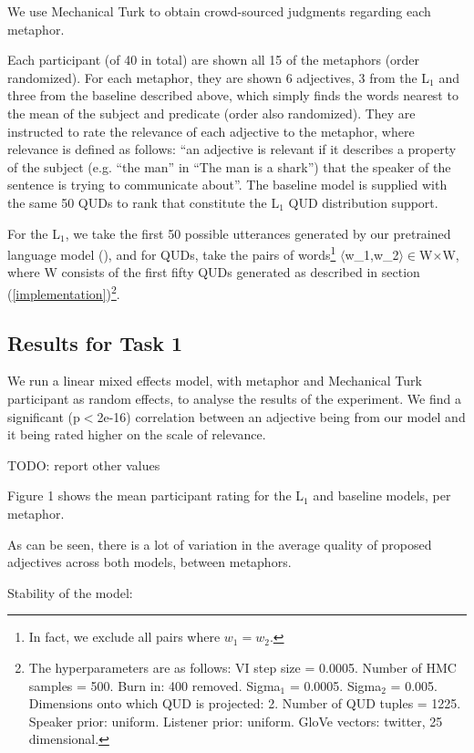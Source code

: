 \documentclass[10pt,letterpaper,twocolumn]{article}
\begin{document}
We use Mechanical Turk to obtain crowd-sourced judgments regarding each metaphor. 

	Each participant (of 40 in total) are shown all 15 of the metaphors (order randomized). For each metaphor, they are shown 6 adjectives, 3 from the L$_1$ and three from the baseline described above, which simply finds the words nearest to the mean of the subject and predicate (order also randomized). They are instructed to rate the relevance of each adjective to the metaphor, where relevance is defined as follows: ``an adjective is relevant if it describes a property of the subject (e.g. ``the man'' in ``The man is a shark'') that the speaker of the sentence is trying to communicate about''. The baseline model is supplied with the same 50 QUDs to rank that constitute the L$_1$ QUD distribution support.

	For the L$_1$, we take the first 50 possible utterances generated by our pretrained language model (\cite{jozefowicz2016exploring}), and for QUDs, take the pairs of words\footnote{In fact, we exclude all pairs where $w_1=w_2$.} $\langle$w_1,w_2$\rangle\in$W$\times$W, where W consists of the first fifty QUDs generated as described in section (\ref{implementation})\footnote{The hyperparameters are as follows: VI step size = 0.0005. Number of HMC samples = 500. Burn in: 400 removed. Sigma$_1$ = 0.0005. Sigma$_2$ = 0.005. Dimensions onto which QUD is projected: 2. Number of QUD tuples = 1225. Speaker prior: uniform. Listener prior: uniform. GloVe vectors: twitter, 25 dimensional.}.

\subsection{Results for Task 1}

We run a linear mixed effects model, with metaphor and Mechanical Turk participant as random effects, to analyse the results of the experiment. We find a significant (p$<$2e-16) correlation between an adjective being from our model and it being rated higher on the scale of relevance. 

	TODO: report other values

Figure 1 shows the mean participant rating for the L$_1$ and baseline models, per metaphor. 

	As can be seen, there is a lot of variation in the average quality of proposed adjectives across both models, between metaphors.

	Stability of the model:
\end{document}
